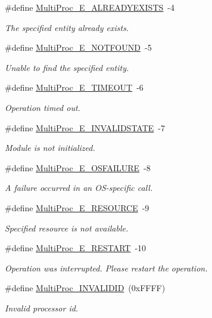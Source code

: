 \begin{DoxyCompactItemize}
\#define \hyperlink{_multi_proc_8h_a18f5c0436a877611489726c797d86556}{MultiProc\_\-E\_\-ALREADYEXISTS}~-\/4
\begin{DoxyCompactList}\small\item\em The specified entity already exists. \item\end{DoxyCompactList}\item 
\#define \hyperlink{_multi_proc_8h_a94763088a2d466568560a039ea675290}{MultiProc\_\-E\_\-NOTFOUND}~-\/5
\begin{DoxyCompactList}\small\item\em Unable to find the specified entity. \item\end{DoxyCompactList}\item 
\#define \hyperlink{_multi_proc_8h_a2f6b71bcbab4cfe1c69f1c5a9403a3d5}{MultiProc\_\-E\_\-TIMEOUT}~-\/6
\begin{DoxyCompactList}\small\item\em Operation timed out. \item\end{DoxyCompactList}\item 
\#define \hyperlink{_multi_proc_8h_a4d77c2159e3d47966e8306c486e0c2da}{MultiProc\_\-E\_\-INVALIDSTATE}~-\/7
\begin{DoxyCompactList}\small\item\em Module is not initialized. \item\end{DoxyCompactList}\item 
\#define \hyperlink{_multi_proc_8h_aae22e0e82ebcff6fcdfb22b0ae26ff7b}{MultiProc\_\-E\_\-OSFAILURE}~-\/8
\begin{DoxyCompactList}\small\item\em A failure occurred in an OS-\/specific call. \item\end{DoxyCompactList}\item 
\#define \hyperlink{_multi_proc_8h_aa72d734728c7c0fc99353e9fdc89d9a1}{MultiProc\_\-E\_\-RESOURCE}~-\/9
\begin{DoxyCompactList}\small\item\em Specified resource is not available. \item\end{DoxyCompactList}\item 
\#define \hyperlink{_multi_proc_8h_aa7adeed5b18aeefd77fb57e333974d5d}{MultiProc\_\-E\_\-RESTART}~-\/10
\begin{DoxyCompactList}\small\item\em Operation was interrupted. Please restart the operation. \item\end{DoxyCompactList}\item 
\#define \hyperlink{_multi_proc_8h_a94a1d14527833bc8294407634d5495d9}{MultiProc\_\-INVALIDID}~(0xFFFF)
\begin{DoxyCompactList}\small\item\em Invalid processor id. \item\end{DoxyCompactList}\end{DoxyCompactItemize}
